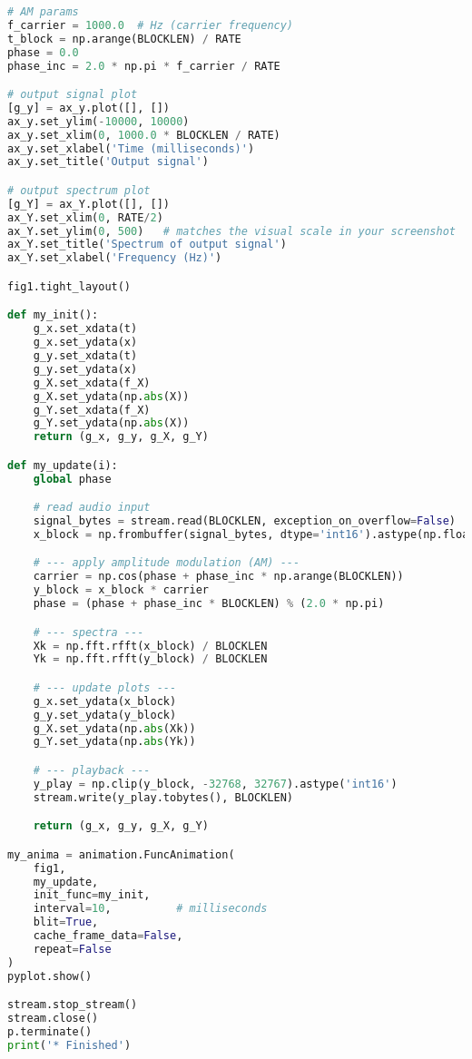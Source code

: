 \documentclass[11pt]{article}
\begin{document}
\begin{lstlisting}[language=python, label={lst:code}, breaklines=true, caption={example code}]
# AM params
f_carrier = 1000.0  # Hz (carrier frequency)
t_block = np.arange(BLOCKLEN) / RATE
phase = 0.0
phase_inc = 2.0 * np.pi * f_carrier / RATE

# output signal plot
[g_y] = ax_y.plot([], [])
ax_y.set_ylim(-10000, 10000)
ax_y.set_xlim(0, 1000.0 * BLOCKLEN / RATE)
ax_y.set_xlabel('Time (milliseconds)')
ax_y.set_title('Output signal')

# output spectrum plot
[g_Y] = ax_Y.plot([], [])
ax_Y.set_xlim(0, RATE/2)
ax_Y.set_ylim(0, 500)   # matches the visual scale in your screenshot
ax_Y.set_title('Spectrum of output signal')
ax_Y.set_xlabel('Frequency (Hz)')

fig1.tight_layout()

def my_init():
    g_x.set_xdata(t)
    g_x.set_ydata(x)
    g_y.set_xdata(t)
    g_y.set_ydata(x)
    g_X.set_xdata(f_X)
    g_X.set_ydata(np.abs(X))
    g_Y.set_xdata(f_X)
    g_Y.set_ydata(np.abs(X))
    return (g_x, g_y, g_X, g_Y)

def my_update(i):
    global phase

    # read audio input
    signal_bytes = stream.read(BLOCKLEN, exception_on_overflow=False)
    x_block = np.frombuffer(signal_bytes, dtype='int16').astype(np.float64)

    # --- apply amplitude modulation (AM) ---
    carrier = np.cos(phase + phase_inc * np.arange(BLOCKLEN))
    y_block = x_block * carrier
    phase = (phase + phase_inc * BLOCKLEN) % (2.0 * np.pi)

    # --- spectra ---
    Xk = np.fft.rfft(x_block) / BLOCKLEN
    Yk = np.fft.rfft(y_block) / BLOCKLEN

    # --- update plots ---
    g_x.set_ydata(x_block)
    g_y.set_ydata(y_block)
    g_X.set_ydata(np.abs(Xk))
    g_Y.set_ydata(np.abs(Yk))

    # --- playback ---
    y_play = np.clip(y_block, -32768, 32767).astype('int16')
    stream.write(y_play.tobytes(), BLOCKLEN)

    return (g_x, g_y, g_X, g_Y)

my_anima = animation.FuncAnimation(
    fig1,
    my_update,
    init_func=my_init,
    interval=10,          # milliseconds
    blit=True,
    cache_frame_data=False,
    repeat=False
)
pyplot.show()

stream.stop_stream()
stream.close()
p.terminate()
print('* Finished')
\end{lstlisting}    

    
\end{document}
